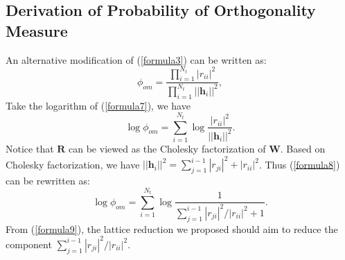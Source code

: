 \documentclass[12pt,letter,final]{article}
\begin{document}
\begin{spacing}{2.5}
\section{Derivation of Probability of Orthogonality Measure}
An alternative modification of (\ref{formula3}) can be written as:
\begin{equation}
\phi_{om}=\frac{\prod_{i=1}^{N_{t}}|r_{ii}|^{2}}{\prod_{i=1}^{N_{t}}||\mathbf{h}_{i}||^{2}},
\label{formula7}
\end{equation}
Take the logarithm of (\ref{formula7}), we have
\begin{equation}
\log{\phi_{om}}=\sum_{i=1}^{N_{t}}\log{\frac{|r_{ii}|^{2}}{||\mathbf{h}_{i}||^{2}}}.
\label{formula8}
\end{equation}  
Notice that $\mathbf{R}$ can be viewed as the Cholesky factorization of $\mathbf{W}$. Based on Cholesky factorization, we have $||\mathbf{h}_{i}||^{2}=\sum^{i-1}_{j=1}|r_{ji}|^{2}+|r_{ii}|^{2}$. Thus (\ref{formula8}) can be rewritten as:
\begin{equation}
\log{\phi_{om}}=\sum_{i=1}^{N_{t}}\log{\frac{1}{\sum^{i-1}_{j=1}|r_{ji}|^{2}/|r_{ii}|^{2}+1}}.
\label{formula9}
\end{equation}  
From (\ref{formula9}), the lattice reduction we proposed should aim to reduce the component $\sum^{i-1}_{j=1}|r_{ji}|^{2}/|r_{ii}|^2$.



\end{spacing}
\end{document}
